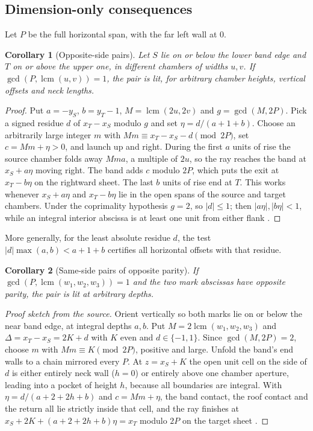 \documentclass[11pt]{article}
\newtheorem{corollary}{Corollary}
\theoremstyle{definition}
\theoremstyle{remark}
\begin{document}
\subsection{Dimension-only consequences}
Let $P$ be the full horizontal span, with the far left wall at $0$.

\begin{corollary}[Opposite-side pairs]\label{cor:opp}
Let $S$ lie on or below the lower band edge and $T$ on or above the upper one, in
different chambers of widths $u,v$. If $\gcd(P,\operatorname{lcm}(u,v))=1$, the
pair is lit, for arbitrary chamber heights, vertical offsets and neck lengths.
\end{corollary}

\begin{proof}
Put $a=-y_S$, $b=y_T-1$, $M=\operatorname{lcm}(2u,2v)$ and $g=\gcd(M,2P)$. Pick a
signed residue $d$ of $x_T-x_S$ modulo $g$ and set $\eta=d/(a+1+b)$. Choose an
arbitrarily large integer $m$ with $Mm\equiv x_T-x_S-d\pmod{2P}$, set
$c=Mm+\eta>0$, and launch up and right. During the first $a$ units of rise the
source chamber folds away $Mma$, a multiple of $2u$, so the ray reaches the band
at $x_S+a\eta$ moving right. The band adds $c$ modulo $2P$, which puts the exit
at $x_T-b\eta$ on the rightward sheet. The last $b$ units of rise end at $T$. This
works whenever $x_S+a\eta$ and $x_T-b\eta$ lie in the open spans of the source and
target chambers. Under the coprimality hypothesis $g=2$, so $|d|\le 1$; then
$|a\eta|,|b\eta|<1$, while an integral interior abscissa is at least one unit from
either flank \cite{R5,d203}.
\end{proof}

More generally, for the least absolute residue $d$, the test
$|d|\max(a,b)<a+1+b$ certifies all horizontal offsets with that residue.

\begin{corollary}[Same-side pairs of opposite parity]\label{cor:same}
If $\gcd(P,\operatorname{lcm}(w_1,w_2,w_3))=1$ and the two mark abscissas have
opposite parity, the pair is lit at arbitrary depths.
\end{corollary}

\begin{proof}[Proof sketch from the source]
Orient vertically so both marks lie on or below the near band edge, at integral
depths $a,b$. Put $M=2\operatorname{lcm}(w_1,w_2,w_3)$ and $\Delta=x_T-x_S=2K+d$
with $K$ even and $d\in\{-1,1\}$. Since $\gcd(M,2P)=2$, choose $m$ with
$Mm\equiv K\pmod{2P}$, positive and large. Unfold the band's end walls to a chain
mirrored every $P$. At $z=x_S+K$ the open unit cell on the side of $d$ is either
entirely neck wall ($h=0$) or entirely above one chamber aperture, leading into a
pocket of height $h$, because all boundaries are integral. With
$\eta=d/(a+2+2h+b)$ and $c=Mm+\eta$, the band contact, the roof contact and the
return all lie strictly inside that cell, and the ray finishes at
$x_S+2K+(a+2+2h+b)\eta=x_T$ modulo $2P$ on the target sheet \cite{R5,d203}.
\end{proof}
\end{document}
